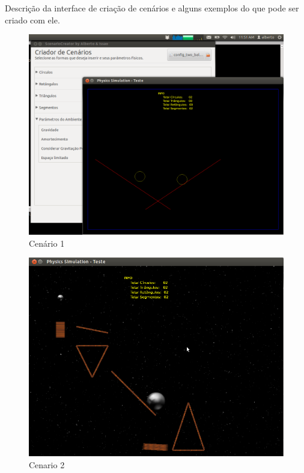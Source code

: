 Descrição da interface de criação de cenários e alguns exemplos do que pode ser criado com ele.


\begin{figure}[H]
	\centering
	\caption{Cenário 1}
	\includegraphics[scale=0.3]{images/cenario-two-balls.png}
	\hspace{0.5cm}
\end{figure}  

  \begin{figure}[H]
	  \centering
	  \caption{Cenario 2}
    \includegraphics[scale=0.4]{images/cenario-todos.png}
  \end{figure}

